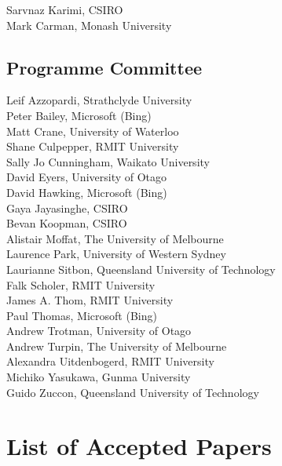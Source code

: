 \documentclass[a4paper]{article}
\begin{document}
Sarvnaz Karimi, CSIRO\\
Mark Carman, Monash University

\subsection*{Programme Committee}
Leif Azzopardi, Strathclyde University\\
Peter Bailey, Microsoft (Bing)\\
Matt Crane, University of Waterloo \\
Shane Culpepper, RMIT University \\
Sally Jo Cunningham, Waikato University \\
David Eyers, University of Otago\\
David Hawking, Microsoft (Bing) \\
Gaya Jayasinghe, CSIRO\\
Bevan Koopman, CSIRO \\
Alistair Moffat, The University of Melbourne \\
Laurence Park, University of Western Sydney\\
Laurianne Sitbon, Queensland University of Technology\\
Falk Scholer, RMIT University \\
James A. Thom, RMIT University \\
Paul Thomas, Microsoft (Bing) \\
Andrew Trotman, University of Otago \\
Andrew Turpin, The University of Melbourne \\
Alexandra Uitdenbogerd, RMIT University\\
Michiko Yasukawa, Gunma University \\
Guido Zuccon, Queensland University of Technology

\newpage

\section*{List of Accepted Papers}
\end{document}
